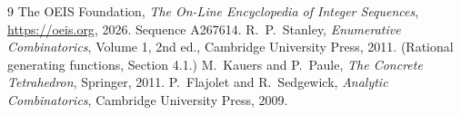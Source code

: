 \documentclass[11pt,a4paper]{article}
\theoremstyle{plain}
\theoremstyle{definition}
\begin{document}
\begin{thebibliography}{9}
 The OEIS Foundation, \emph{The On-Line Encyclopedia of Integer
Sequences}, \url{https://oeis.org}, 2026. Sequence A267614.
 R.~P.~Stanley, \emph{Enumerative Combinatorics}, Volume 1, 2nd ed.,
Cambridge University Press, 2011. (Rational generating functions, Section 4.1.)
 M.~Kauers and P.~Paule, \emph{The Concrete Tetrahedron}, Springer, 2011.
 P.~Flajolet and R.~Sedgewick, \emph{Analytic Combinatorics}, Cambridge
University Press, 2009.
\end{thebibliography}
\end{document}
